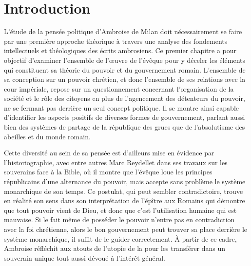 \section*{Introduction}

L'étude de la pensée politique d'Ambroise de Milan doit nécessairement se faire par une première approche théorique à travers une analyse des fondements intellectuels et théologiques des écrits ambrosiens. Ce premier chapitre a pour objectif d'examiner l'ensemble de l'œuvre de l'évêque pour y déceler les éléments qui constituent sa théorie du pouvoir et du gouvernement romain. L'ensemble de sa conception sur un pouvoir chrétien, et donc l'ensemble de ses relations avec la cour impériale, repose sur un questionnement concernant l'organisation de la société et le rôle des citoyens en plus de l'agencement des détenteurs du pouvoir, ne se fermant pas derrière un seul concept politique. Il se montre ainsi capable d'identifier les aspects positifs de diverses formes de gouvernement, parlant aussi bien des systèmes de partage de la république des grues que de l'absolutisme des abeilles et du monde romain.

\bigskip

Cette diversité au sein de sa pensée est d'ailleurs mise en évidence par l'historiographie, avec entre autres Marc Reydellet dans ses travaux sur les souverains face à la Bible, où il montre que l'évêque loue les principes républicains d'une alternance du pouvoir, mais accepte sans problème le système monarchique de son temps\autocite{reydellet_bible}. Ce postulat, qui peut sembler contradictoire, trouve en réalité son sens dans son interprétation de l'épître aux Romains qui démontre que tout pouvoir vient de Dieu, et donc que c'est l'utilisation humaine qui est mauvaise. Si le fait même de posséder le pouvoir n'entre pas en contradiction avec la foi chrétienne, alors le bon gouvernement peut trouver sa place derrière le système monarchique, il suffit de le guider correctement. À partir de ce cadre, Ambroise réfléchit aux atouts de l'utopie de la  pour les transférer dans un souverain unique tout aussi dévoué à l'intérêt général.

\bigskip

